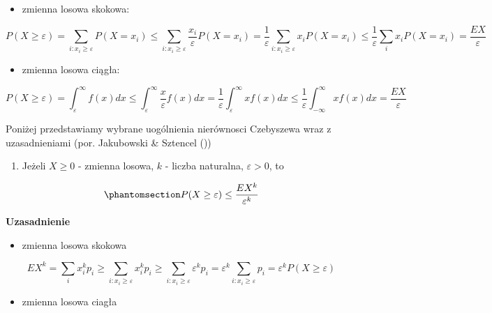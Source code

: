 \documentclass[
  letterpaper,
  DIV=11,
  numbers=noendperiod]{scrreprt}
\providecommand{\tightlist}{%
  \setlength{\itemsep}{0pt}\setlength{\parskip}{0pt}}\usepackage{longtable,booktabs,array}
\begin{document}
\begin{itemize}
\tightlist
\item
  zmienna losowa skokowa:
\end{itemize}

\[ P(X \ge \varepsilon) = \sum_{i:x_i \ge  \varepsilon} P(X=x_i) \le \sum_{i:x_i \ge  \varepsilon} \frac{x_i}{\varepsilon}P(X=x_i) = \frac{1}{\varepsilon}  \sum_{i:x_i \ge  \varepsilon} x_i P(X=x_i)  \le \frac{1}{\varepsilon}  \sum_i x_i P(X=x_i) = \frac{EX}{\varepsilon}\]

\begin{itemize}
\tightlist
\item
  zmienna losowa ciągła:
\end{itemize}

\[ P(X \ge \varepsilon) = \int_{\varepsilon}^{\infty} f(x) dx \le  \int_{\varepsilon}^{\infty} \frac{x}{\varepsilon} f(x) dx =         \frac{1}{\varepsilon}  \int_{\varepsilon}^{\infty} x f(x) dx  \le \frac{1}{\varepsilon}  \int_{-\infty}^{\infty} x f(x) dx     = \frac{EX}{\varepsilon}\]

Poniżej przedstawiamy wybrane uogólnienia nierównosci Czebyszewa wraz z
uzasadnieniami (por. Jakubowski \& Sztencel
())

\begin{enumerate}
\def\labelenumi{\arabic{enumi}.}
\tightlist
\item
  Jeżeli \(X \ge 0\) - zmienna losowa, \(k\) - liczba naturalna,
  \(\varepsilon>0\), to
\end{enumerate}

\begin{equation}\phantomsection\label{eq-Czeb_1}{ P(X \ge \varepsilon) \le \frac{EX^k}{\varepsilon^k}}\end{equation}

\textbf{Uzasadnienie}

\begin{itemize}
\tightlist
\item
  zmienna losowa skokowa
\end{itemize}

\[EX^k= \sum_i x_i^kp_i \ge \sum_{i:x_i \ge\varepsilon} x_i^kp_i \ge  \sum_{i:x_i \ge \varepsilon} \varepsilon^kp_i =  \varepsilon^k \sum_{i:x_i \ge \varepsilon} p_i   = \varepsilon^k P(X \ge \varepsilon)\]

\begin{itemize}
\tightlist
\item
  zmienna losowa ciagła
\end{itemize}
\end{document}
